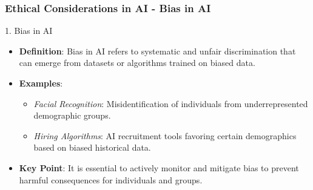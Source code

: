 \documentclass[aspectratio=169]{beamer}
\begin{document}
\begin{frame}[fragile]
    \frametitle{Ethical Considerations in AI - Bias in AI}
    \begin{block}{1. Bias in AI}
        \begin{itemize}
            \item \textbf{Definition}: Bias in AI refers to systematic and unfair discrimination that can emerge from datasets or algorithms trained on biased data.
            \item \textbf{Examples}:
            \begin{itemize}
                \item \textit{Facial Recognition}: Misidentification of individuals from underrepresented demographic groups.
                \item \textit{Hiring Algorithms}: AI recruitment tools favoring certain demographics based on biased historical data.
            \end{itemize}
            \item \textbf{Key Point}: It is essential to actively monitor and mitigate bias to prevent harmful consequences for individuals and groups.
        \end{itemize}
    \end{block}
\end{frame}
\end{document}
